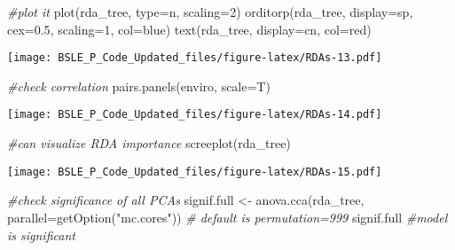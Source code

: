 \documentclass[
]{article}
\newenvironment{Shaded}{\begin{snugshade}}{\end{snugshade}}
\newcommand{\AttributeTok}[1]{\textcolor[rgb]{0.77,0.63,0.00}{#1}}
\newcommand{\CommentTok}[1]{\textcolor[rgb]{0.56,0.35,0.01}{\textit{#1}}}
\newcommand{\DecValTok}[1]{\textcolor[rgb]{0.00,0.00,0.81}{#1}}
\newcommand{\FloatTok}[1]{\textcolor[rgb]{0.00,0.00,0.81}{#1}}
\newcommand{\FunctionTok}[1]{\textcolor[rgb]{0.00,0.00,0.00}{#1}}
\newcommand{\NormalTok}[1]{#1}
\newcommand{\OtherTok}[1]{\textcolor[rgb]{0.56,0.35,0.01}{#1}}
\newcommand{\StringTok}[1]{\textcolor[rgb]{0.31,0.60,0.02}{#1}}
\begin{document}
\begin{Shaded}
\begin{Highlighting}[]
\CommentTok{\#plot it}
\FunctionTok{plot}\NormalTok{(rda\_tree, }\AttributeTok{type=}\StringTok{\textquotesingle{}n\textquotesingle{}}\NormalTok{, }\AttributeTok{scaling=}\DecValTok{2}\NormalTok{)}
\FunctionTok{orditorp}\NormalTok{(rda\_tree, }\AttributeTok{display=}\StringTok{\textquotesingle{}sp\textquotesingle{}}\NormalTok{, }\AttributeTok{cex=}\FloatTok{0.5}\NormalTok{, }\AttributeTok{scaling=}\DecValTok{1}\NormalTok{, }\AttributeTok{col=}\StringTok{\textquotesingle{}blue\textquotesingle{}}\NormalTok{)}
\FunctionTok{text}\NormalTok{(rda\_tree, }\AttributeTok{display=}\StringTok{\textquotesingle{}cn\textquotesingle{}}\NormalTok{, }\AttributeTok{col=}\StringTok{\textquotesingle{}red\textquotesingle{}}\NormalTok{)}
\end{Highlighting}
\end{Shaded}

\texttt{[image: BSLE\_P\_Code\_Updated\_files/figure-latex/RDAs-13.pdf]}

\begin{Shaded}
\begin{Highlighting}[]
\CommentTok{\#check correlation}
\FunctionTok{pairs.panels}\NormalTok{(enviro, }\AttributeTok{scale=}\NormalTok{T)}
\end{Highlighting}
\end{Shaded}

\texttt{[image: BSLE\_P\_Code\_Updated\_files/figure-latex/RDAs-14.pdf]}

\begin{Shaded}
\begin{Highlighting}[]
\CommentTok{\#can visualize RDA importance}
\FunctionTok{screeplot}\NormalTok{(rda\_tree)}
\end{Highlighting}
\end{Shaded}

\texttt{[image: BSLE\_P\_Code\_Updated\_files/figure-latex/RDAs-15.pdf]}

\begin{Shaded}
\begin{Highlighting}[]
\CommentTok{\#check significance of all PCAs}
\NormalTok{signif.full }\OtherTok{\textless{}{-}} \FunctionTok{anova.cca}\NormalTok{(rda\_tree, }\AttributeTok{parallel=}\FunctionTok{getOption}\NormalTok{(}\StringTok{"mc.cores"}\NormalTok{)) }\CommentTok{\# default is permutation=999}
\NormalTok{signif.full }\CommentTok{\#model is significant}
\end{Highlighting}
\end{Shaded}
\end{document}
